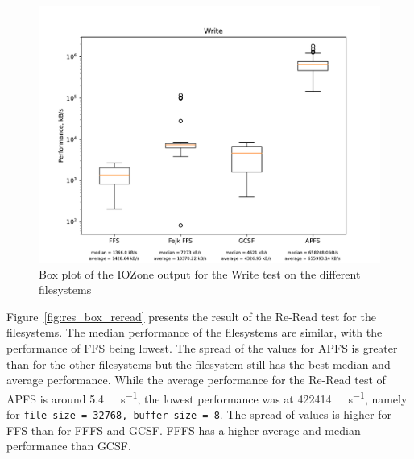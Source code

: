 \begin{figure}[!ht]
	\label{fig:res_box_write}
	\begin{center}
		\includegraphics[width=1.0\textwidth]{figures/benchmarking/Write_box.pdf}
	\end{center}
	\caption{Box plot of the IOZone output for the Write test on the different filesystems}
\end{figure}

\FloatBarrier

Figure~\ref{fig:res_box_reread} presents the result of the \mbox{Re-Read} test for the filesystems. The median performance of the filesystems are similar, with the performance of \gls{FFS} being lowest. The spread of the values for \gls{APFS} is greater than for the other filesystems but the filesystem still has the best median and average performance. While the average performance for the Re-Read test of \gls{APFS} is around \SI[per-mode = symbol]{5.4}{\giga\byte\per\second}, the lowest performance was at \SI[per-mode = symbol]{422414}{\kilo\byte\per\second}, namely for \texttt{file size = 32768, buffer size = 8}. The spread of values is higher for \gls{FFS} than for \gls{FFFS} and \gls{GCSF}. \gls{FFFS} has a higher average and median performance than \gls{GCSF}.

